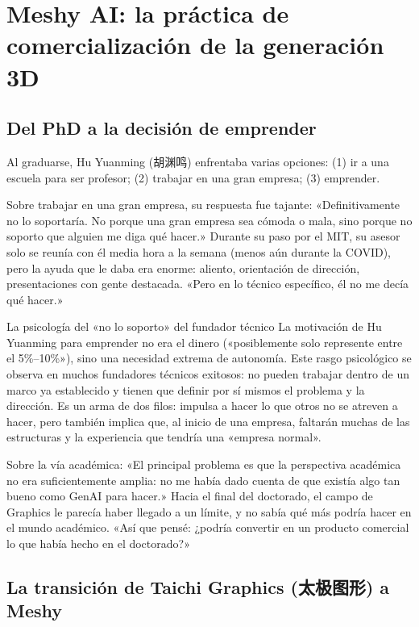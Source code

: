 \section{Meshy AI: la práctica de comercialización de la generación 3D}

\subsection{Del PhD a la decisión de emprender}

Al graduarse, Hu Yuanming (胡渊鸣) enfrentaba varias opciones: (1) ir a una escuela para ser profesor; (2) trabajar en una gran empresa; (3) emprender.

Sobre trabajar en una gran empresa, su respuesta fue tajante: «Definitivamente no lo soportaría. No porque una gran empresa sea cómoda o mala, sino porque no soporto que alguien me diga qué hacer.» Durante su paso por el MIT, su asesor solo se reunía con él media hora a la semana (menos aún durante la COVID), pero la ayuda que le daba era enorme: aliento, orientación de dirección, presentaciones con gente destacada. «Pero en lo técnico específico, él no me decía qué hacer.»

\begin{knowledgebox}{La psicología del «no lo soporto» del fundador técnico}
La motivación de Hu Yuanming para emprender no era el dinero («posiblemente solo represente entre el 5\%--10\%»), sino una necesidad extrema de autonomía. Este rasgo psicológico se observa en muchos fundadores técnicos exitosos: no pueden trabajar dentro de un marco ya establecido y tienen que definir por sí mismos el problema y la dirección. Es un arma de dos filos: impulsa a hacer lo que otros no se atreven a hacer, pero también implica que, al inicio de una empresa, faltarán muchas de las estructuras y la experiencia que tendría una «empresa normal».
\end{knowledgebox}

Sobre la vía académica: «El principal problema es que la perspectiva académica no era suficientemente amplia: no me había dado cuenta de que existía algo tan bueno como GenAI para hacer.» Hacia el final del doctorado, el campo de Graphics le parecía haber llegado a un límite, y no sabía qué más podría hacer en el mundo académico. «Así que pensé: ¿podría convertir en un producto comercial lo que había hecho en el doctorado?»

\subsection{La transición de Taichi Graphics (太极图形) a Meshy}

